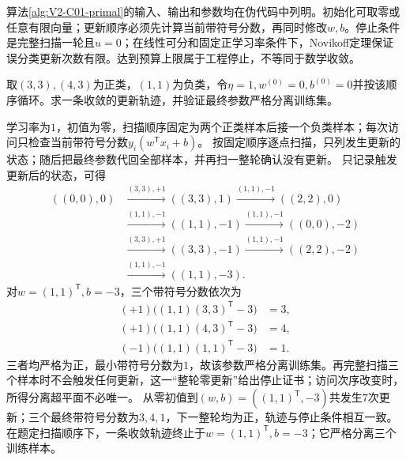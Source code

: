 算法\ref{alg:V2-C01-primal}的输入、输出和参数均在伪代码中列明。初始化可取零或任意有限向量；更新顺序必须先计算当前带符号分数，再同时修改$w,b$。停止条件是完整扫描一轮且$u=0$；在线性可分和固定正学习率条件下，Novikoff定理保证误分类更新次数有限。达到预算上限属于工程停止，不等同于数学收敛。

\begin{example}[原始形式的手工执行]\label{exm:V2-C01-primal}
取$(3,3),(4,3)$为正类，$(1,1)$为负类，令$\eta=1,w^{(0)}=0,b^{(0)}=0$并按该顺序循环。求一条收敛的更新轨迹，并验证最终参数严格分离训练集。
\end{example}
\begin{solution}
\SolGiven 学习率为$1$，初值为零，扫描顺序固定为两个正类样本后接一个负类样本；每次访问只检查当前带符号分数$y_i(w^{\mathsf T}x_i+b)$。
\SolPlan 按固定顺序逐点扫描，只列发生更新的状态；随后把最终参数代回全部样本，并再扫一整轮确认没有更新。
\SolDerive
只记录触发更新后的状态，可得
\[
\begin{aligned}
((0,0),0)
&\xrightarrow{(3,3),+1}((3,3),1)
\xrightarrow{(1,1),-1}((2,2),0)\\
&\xrightarrow{(1,1),-1}((1,1),-1)
\xrightarrow{(1,1),-1}((0,0),-2)\\
&\xrightarrow{(3,3),+1}((3,3),-1)
\xrightarrow{(1,1),-1}((2,2),-2)\\
&\xrightarrow{(1,1),-1}((1,1),-3).
\end{aligned}
\]
对$w=(1,1)^{\mathsf T},b=-3$，三个带符号分数依次为
\[
\begin{aligned}
(+1)\bigl((1,1)(3,3)^{\mathsf T}-3\bigr)&=3,\\
(+1)\bigl((1,1)(4,3)^{\mathsf T}-3\bigr)&=4,\\
(-1)\bigl((1,1)(1,1)^{\mathsf T}-3\bigr)&=1.
\end{aligned}
\]
三者均严格为正，最小带符号分数为$1$，故该参数严格分离训练集。再完整扫描三个样本时不会触发任何更新，这一“整轮零更新”给出停止证书；访问次序改变时，所得分离超平面不必唯一。
\SolCheck 从零初值到$(w,b)=((1,1)^{\mathsf T},-3)$共发生$7$次更新；三个最终带符号分数为$3,4,1$，下一整轮均为正，轨迹与停止条件相互一致。
\SolAnswer 在题定扫描顺序下，一条收敛轨迹终止于$w=(1,1)^{\mathsf T},b=-3$；它严格分离三个训练样本。
\end{solution}


